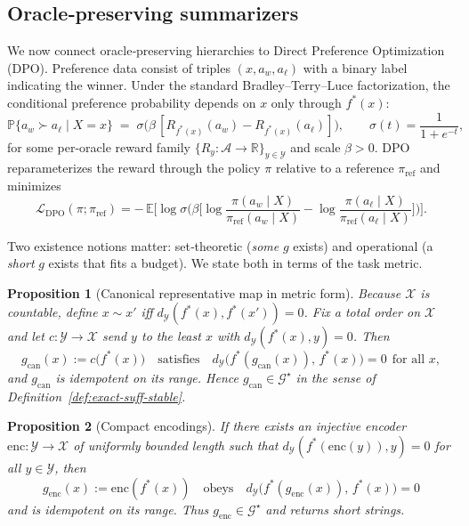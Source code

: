 \documentclass[11pt]{article}
\newtheorem{proposition}{Proposition}
\newcommand{\Strings}{\mathcal{X}}       %
\newcommand{\Y}{\mathcal{Y}}               %
\newcommand{\A}{\mathcal{A}}               %
\newcommand{\fstar}{f^*}               %
\newcommand{\Gstar}{\mathcal{G}^\star}     %
\newcommand{\Prob}{\mathbb{P}}
\newcommand{\E}{\mathbb{E}}
\newcommand{\metric}{d_{\Y}}
\newcommand{\R}{\mathbb{R}}
\begin{document}
\subsection{Oracle‑preserving summarizers}
\label{sec:existence}


We now connect oracle‑preserving hierarchies to Direct Preference Optimization (DPO). Preference data consist of triples $(x,a_w,a_\ell)$ with a binary label indicating the winner. Under the standard Bradley–Terry–Luce factorization, the conditional preference probability depends on $x$ only through $\fstar(x)$:
\begin{equation}\label{eq:BT-oracle}
\Prob\{a_w\succ a_\ell\mid X=x\}\;=\;\sigma\!\Big(\beta\,[R_{\fstar(x)}(a_w)-R_{\fstar(x)}(a_\ell)]\Big),
\qquad\sigma(t)=\frac{1}{1+ e^{-t}},
\end{equation}
for some per‑oracle reward family $\{R_y:\A\to\R\}_{y\in\Y}$ and scale $\beta>0$.
DPO reparameterizes the reward through the policy $\pi$ relative to a reference $\pi_{\mathrm{ref}}$ and minimizes
\begin{equation}\label{eq:dpo-loss}
\mathcal{L}_{\mathrm{DPO}}(\pi;\pi_{\mathrm{ref}})
=-\,\E\Bigg[\log \sigma\!\Big(\beta\Big[
\log\frac{\pi(a_w\mid X)}{\pi_{\mathrm{ref}}(a_w\mid X)}-\log\frac{\pi(a_\ell\mid X)}{\pi_{\mathrm{ref}}(a_\ell\mid X)}
\Big]\Big)\Bigg].
\end{equation}

Two existence notions matter: set‑theoretic (\emph{some} $g$ exists) and operational (a \emph{short} $g$ exists that fits a budget). We state both in terms of the task metric.

\begin{proposition}[Canonical representative map in metric form]
\label{prop:canonical}
Because $\Strings$ is countable, define $x\sim x'$ iff $\metric(\fstar(x),\fstar(x'))=0$. Fix a total order on $\Strings$ and let $c:\Y\to\Strings$ send $y$ to the least $x$ with $\metric(\fstar(x),y)=0$. Then
\[
g_{\mathrm{can}}(x):=c\big(\fstar(x)\big)
\quad\text{satisfies}\quad
\metric\!\big(\fstar(g_{\mathrm{can}}(x)),\,\fstar(x)\big)=0\ \ \text{for all }x,
\]
and $g_{\mathrm{can}}$ is idempotent on its range. Hence $g_{\mathrm{can}}\in\Gstar$ in the sense of Definition~\ref{def:exact-suff-stable}.
\end{proposition}

\begin{proposition}[Compact encodings]
\label{prop:encoding}
If there exists an injective encoder $\mathrm{enc}:\Y\to\Strings$ of uniformly bounded length such that
$\metric(\fstar(\mathrm{enc}(y)),y)=0$ for all $y\in\Y$, then
\[
g_{\mathrm{enc}}(x):=\mathrm{enc}(\fstar(x))
\quad\text{obeys}\quad
\metric\!\big(\fstar(g_{\mathrm{enc}}(x)),\,\fstar(x)\big)=0
\]
and is idempotent on its range. Thus $g_{\mathrm{enc}}\in\Gstar$ and returns short strings.
\end{proposition}
\end{document}
